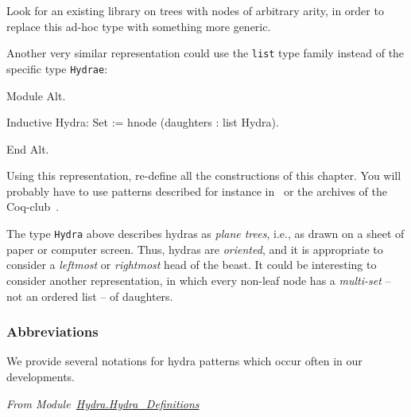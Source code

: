 
%



\begin{project}
Look for an existing library on trees with nodes of arbitrary arity, in order to replace  this ad-hoc type with something more generic.
\end{project}



\begin{project}

 Another very similar representation could use the \texttt{list} type family instead of the specific 
type \texttt{Hydrae}:


\begin{Coqalt}
Module Alt.

Inductive Hydra: Set :=
  hnode (daughters : list Hydra).

End Alt.
\end{Coqalt}

Using this representation, re-define all the constructions of this chapter.
You will probably have to use patterns described for instance in~\cite{BC04} or the archives of the Coq-club~\cite{Coq}.

  
\end{project}



\begin{project}
The type \texttt{Hydra} above describes hydras as \emph{plane trees}, i.e., as drawn on a sheet of paper or computer screen. Thus, hydras are \emph{oriented},
and it is appropriate to consider a \emph{leftmost} or \emph{rightmost} head of
the beast. It could be interesting to consider another representation, in which
every non-leaf node has a \emph{multi-set} -- not an ordered list -- of daughters.
\end{project}

\subsubsection{Abbreviations}

We provide several notations for hydra patterns  which occur often in our developments. 

\vspace{4pt}
\noindent
\emph{From Module~\href{../theories/html/hydras.Hydra.Hydra_Definitions.html\#head}{Hydra.Hydra\_Definitions}}

